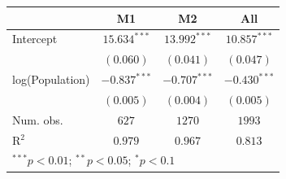 
\begin{tabular}{l c c c}
\toprule
 & M1 & M2 & All \\
\midrule
Intercept       & $15.634^{***}$ & $13.992^{***}$ & $10.857^{***}$ \\
                & $(0.060)$      & $(0.041)$      & $(0.047)$      \\
log(Population) & $-0.837^{***}$ & $-0.707^{***}$ & $-0.430^{***}$ \\
                & $(0.005)$      & $(0.004)$      & $(0.005)$      \\
\midrule
Num. obs.       & $627$          & $1270$         & $1993$         \\
R$^2$           & $0.979$        & $0.967$        & $0.813$        \\
\bottomrule
\multicolumn{4}{l}{\scriptsize{$^{***}p<0.01$; $^{**}p<0.05$; $^{*}p<0.1$}}
\end{tabular}
